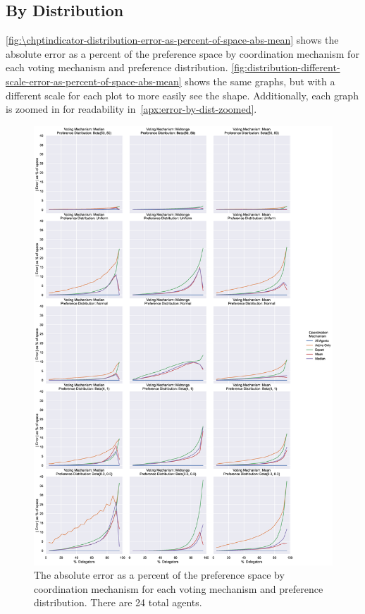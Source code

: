 \subsection{By Distribution}\label{subsec:\chptindicator-results-distribution}
\autoref{fig:\chptindicator-distribution-error-as-percent-of-space-abs-mean} shows
the absolute error as a percent of the preference space by coordination mechanism for
each voting mechanism and preference distribution.
\autoref{fig:distribution-different-scale-error-as-percent-of-space-abs-mean} shows
the same graphs, but with a different scale for each plot to more easily see the shape.
Additionally, each graph is zoomed in for readability
in~\autoref{apx:error-by-dist-zoomed}.

\begin{figure}[p]
    \centering
    \includegraphics[scale=0.35]
    {content/chapter2/figures/distribution_error_as_percent_of_space_abs_mean}
    \caption{
        The absolute error as a percent of the preference space by coordination
        mechanism for each voting mechanism and preference distribution.
        There are 24 total agents.
    }
    \label{fig:\chptindicator-distribution-error-as-percent-of-space-abs-mean}
\end{figure}

